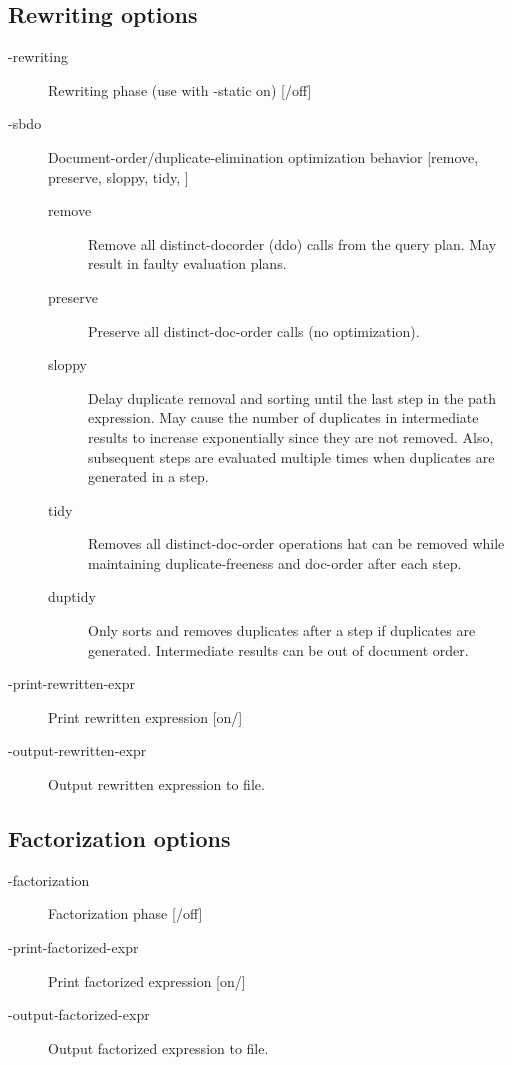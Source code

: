 \subsection{Rewriting options}
\begin{description}
\item[-rewriting] Rewriting phase (use with -static on) [/off]
\item[-sbdo] Document-order/duplicate-elimination optimization
  behavior [remove, preserve, sloppy, tidy, ]
\begin{description}
\item[remove] Remove all distinct-docorder (ddo) calls from the query
 plan. May result in faulty evaluation plans.
\item[preserve] Preserve all distinct-doc-order calls (no
 optimization).
\item[sloppy] Delay duplicate removal and sorting until the last
  step in the path expression. May cause the number of duplicates in
  intermediate results to increase exponentially since they are not
  removed. Also, subsequent steps are evaluated multiple times when
  duplicates are generated in a step.
\item[tidy] Removes all distinct-doc-order operations hat can be
 removed while maintaining duplicate-freeness and doc-order after each
 step.
\item[duptidy] Only sorts and removes duplicates after a step if duplicates are generated. Intermediate results can be out of document order.
\end{description}

\item[-print-rewritten-expr]  Print rewritten expression [on/]
\item[-output-rewritten-expr]  Output rewritten expression to file.
\end{description}

\subsection{Factorization options}
\begin{description}
\item[-factorization] Factorization phase [/off]

\item[-print-factorized-expr]  Print factorized expression [on/]
\item[-output-factorized-expr]  Output factorized expression to file.
\end{description}

